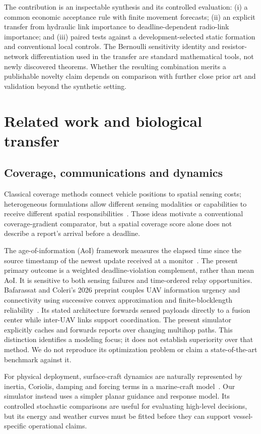 \documentclass[10pt,a4paper,twocolumn]{article}
\newcommand{\1}{\mathbf 1}
\begin{document}
The contribution is an inspectable synthesis and its controlled evaluation:
(i) a common economic acceptance rule with finite movement forecasts;
(ii) an explicit transfer from hydraulic link importance to deadline-dependent
radio-link importance; and (iii) paired tests against a development-selected
static formation and conventional local controls. The Bernoulli sensitivity
identity and resistor-network differentiation used in the transfer are standard
mathematical tools, not newly discovered theorems. Whether the resulting
combination merits a publishable novelty claim depends on comparison with further
close prior art and validation beyond the synthetic setting.

\section{Related work and biological transfer}
\subsection{Coverage, communications and dynamics}
Classical coverage methods connect vehicle positions to spatial sensing costs;
heterogeneous formulations allow different sensing modalities or capabilities
to receive different spatial responsibilities~\cite{cortes2004,santos2018}.
Those ideas motivate a conventional coverage-gradient comparator, but a spatial
coverage score alone does not describe a report's arrival before a deadline.

The age-of-information (AoI) framework measures the elapsed time since the source
timestamp of the newest update received at a monitor~\cite{yates2016}. The present
primary outcome is a weighted deadline-violation complement, rather than mean AoI.
It is sensitive to both sensing failures and time-ordered relay opportunities.
Bafarassat and Coleri's 2026 preprint couples UAV information urgency and
connectivity using successive convex approximation and finite-blocklength
reliability~\cite{bafarassat2026}. Its stated architecture forwards sensed payloads
directly to a fusion center while inter-UAV links support coordination. The present
simulator explicitly caches and forwards reports over changing multihop paths.
This distinction identifies a modeling focus; it does not establish superiority
over that method. We do not reproduce its optimization problem or claim a
state-of-the-art benchmark against it.

For physical deployment, surface-craft dynamics are naturally represented by
inertia, Coriolis, damping and forcing terms in a marine-craft
model~\cite{fossen2021}. Our simulator instead uses a simpler planar guidance and
response model. Its controlled stochastic comparisons are useful for evaluating
high-level decisions, but its energy and weather curves must be fitted before
they can support vessel-specific operational claims.
\end{document}
